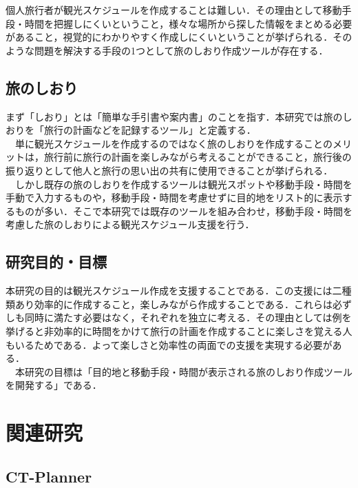 \documentclass{funthesis}
\begin{document}
個人旅行者が観光スケジュールを作成することは難しい．その理由として移動手段・時間を把握しにくいということ，様々な場所から探した情報をまとめる必要があること，視覚的にわかりやすく作成しにくいということが挙げられる．そのような問題を解決する手段の1つとして旅のしおり作成ツールが存在する．\\



\section{旅のしおり}
まず「しおり」とは「簡単な手引書や案内書」のことを指す．本研究では旅のしおりを「旅行の計画などを記録するツール」と定義する．\\
　単に観光スケジュールを作成するのではなく旅のしおりを作成することのメリットは，旅行前に旅行の計画を楽しみながら考えることができること，旅行後の振り返りとして他人と旅行の思い出の共有に使用できることが挙げられる．\\
　しかし既存の旅のしおりを作成するツールは観光スポットや移動手段・時間を手動で入力するものや，移動手段・時間を考慮せずに目的地をリスト的に表示するものが多い．そこで本研究では既存のツールを組み合わせ，移動手段・時間を考慮した旅のしおりによる観光スケジュール支援を行う．


\section{研究目的・目標}

本研究の目的は観光スケジュール作成を支援することである．この支援には二種類あり効率的に作成すること，楽しみながら作成することである．これらは必ずしも同時に満たす必要はなく，それぞれを独立に考える．その理由としては例を挙げると非効率的に時間をかけて旅行の計画を作成することに楽しさを覚える人もいるためである．よって楽しさと効率性の両面での支援を実現する必要がある．\\
　本研究の目標は「目的地と移動手段・時間が表示される旅のしおり作成ツールを開発する」である．%


\chapter{関連研究}%

\section{CT-Planner}
\end{document}
